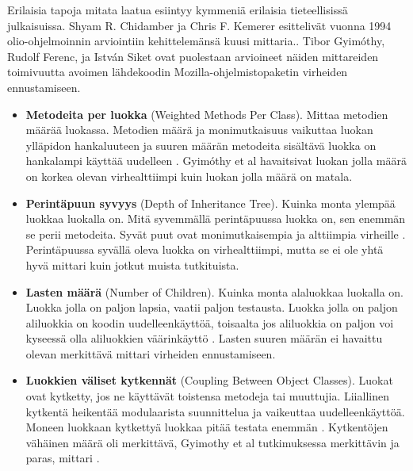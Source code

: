 \documentclass[finnish]{tktltiki2}
\theoremstyle{definition}
\theoremstyle{remark}
\begin{document}
Erilaisia tapoja mitata laatua esiintyy kymmeniä erilaisia tieteellisissä julkaisuissa. Shyam R. Chidamber ja Chris F. Kemerer esittelivät vuonna 1994 olio-ohjelmoinnin arviointiin kehittelemänsä kuusi mittaria.\cite{Chidamber94}. Tibor Gyimóthy, Rudolf Ferenc, ja István Siket ovat puolestaan arvioineet näiden mittareiden toimivuutta avoimen lähdekoodin Mozilla-ohjelmistopaketin virheiden ennustamiseen. \cite{Gyimothy05}


\begin{itemize}

  \item \textbf{Metodeita per luokka} (Weighted Methods Per Class). Mittaa metodien määrää luokassa. Metodien määrä ja monimutkaisuus vaikuttaa luokan ylläpidon hankaluuteen ja suuren määrän metodeita sisältävä luokka on hankalampi käyttää uudelleen \cite{Chidamber94}. Gyimóthy et al havaitsivat luokan jolla määrä on korkea olevan virhealttiimpi kuin luokan jolla määrä on matala. \cite{Gyimothy05}

  \item \textbf{Perintäpuun syvyys} (Depth of Inheritance Tree). Kuinka monta ylempää luokkaa luokalla on. Mitä syvemmällä perintäpuussa luokka on, sen enemmän se perii metodeita. Syvät puut ovat monimutkaisempia ja alttiimpia virheille \cite{Chidamber94}. Perintäpuussa syvällä oleva luokka on virhealttiimpi, mutta se ei ole yhtä hyvä mittari kuin jotkut muista tutkituista. \cite{Gyimothy05}

  \item \textbf{Lasten määrä} (Number of Children). Kuinka monta alaluokkaa luokalla on. Luokka jolla on paljon lapsia, vaatii paljon testausta. Luokka jolla on paljon aliluokkia on koodin uudelleenkäyttöä, toisaalta jos aliluokkia on paljon voi kyseessä olla aliluokkien väärinkäyttö \cite{Chidamber94}. Lasten suuren määrän ei havaittu olevan merkittävä mittari virheiden ennustamiseen. \cite{Gyimothy05}

  \item \textbf{Luokkien väliset kytkennät} (Coupling Between Object Classes). Luokat ovat kytketty, jos ne käyttävät toistensa metodeja tai muuttujia. Liiallinen kytkentä heikentää modulaarista suunnittelua ja vaikeuttaa uudelleenkäyttöä. Moneen luokkaan kytkettyä luokkaa pitää testata enemmän \cite{Chidamber94}. Kytkentöjen vähäinen määrä oli merkittävä, Gyimothy et al tutkimuksessa merkittävin ja paras, mittari \cite{Gyimothy05}.


\end{itemize}
\end{document}
